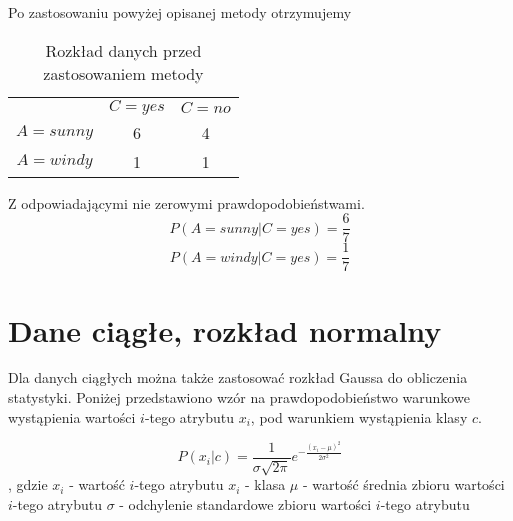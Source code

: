 Po zastosowaniu powyżej opisanej metody otrzymujemy

\begin{table}[H]
\centering
\caption{Rozkład danych przed zastosowaniem metody}
\begin{tabular}{ ccc }
 & $C = yes$ & $C = no$ \\
$A = sunny$ & 6 & 4 \\
$A = windy$ & 1 & 1 \\
\end{tabular}
\end{table}
Z odpowiadającymi nie zerowymi prawdopodobieństwami.
$$P(A = sunny | C = yes) = \frac{6}{7} $$
$$P(A = windy | C = yes) = \frac{1}{7} $$
	\section{Dane ciągłe, rozkład normalny}
Dla danych ciągłych można także zastosować rozkład Gaussa do obliczenia statystyki. Poniżej przedstawiono wzór na prawdopodobieństwo warunkowe wystąpienia wartości $i$-tego atrybutu $x_i$, pod warunkiem wystąpienia klasy $c$.

$$ P(x_i|c) = \frac{1}{\sigma\sqrt{2\pi}}e^{-\frac{(x_i - \mu)^2}{2\sigma^2}}$$, gdzie\newline
$x_i$ - wartość $i$-tego atrybutu\newline
$x_i$ - klasa\newline
$\mu$ - wartość średnia zbioru wartości $i$-tego atrybutu\newline
$\sigma$ - odchylenie standardowe zbioru wartości $i$-tego atrybutu\newline